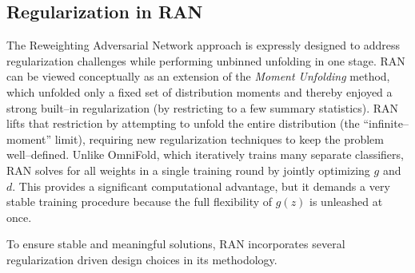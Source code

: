     \subsection{Regularization in RAN}
        The Reweighting Adversarial Network approach is expressly designed to address regularization challenges while performing unbinned unfolding in one stage.
        RAN can be viewed conceptually as an extension of the \emph{Moment Unfolding} method, which unfolded only a fixed set of distribution moments and thereby enjoyed a strong built--in regularization (by restricting to a few summary statistics).
        RAN lifts that restriction by attempting to unfold the entire distribution (the “infinite--moment” limit), requiring new regularization techniques to keep the problem well--defined.\kd{}
        Unlike OmniFold, which iteratively trains many separate classifiers, RAN solves for all weights in a single training round by jointly optimizing $g$ and $d$.
        This provides a significant computational advantage, but it demands a very stable training procedure because the full flexibility of $g(z)$ is unleashed at once.

        To ensure stable and meaningful solutions, RAN incorporates several regularization driven design choices in its methodology.

